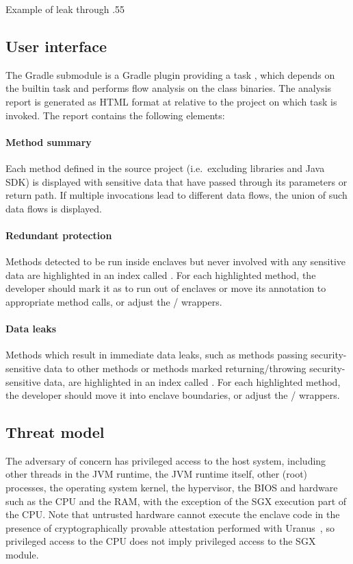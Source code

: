 {Example of leak through }{.55}

\subsection{User interface}\label{subsec:user-interface}
The  Gradle submodule
is a Gradle plugin providing a task ,
which depends on the  builtin task
and performs flow analysis on the class binaries.
The analysis report is generated as HTML format at
relative to the project on which task is invoked.
The report contains the following elements:

\paragraph{Method summary}
Each method defined in the source project (i.e.\ excluding libraries and Java \ac{SDK})
is displayed with sensitive data that have passed through its parameters or return path.
If multiple invocations lead to different data flows,
the union of such data flows is displayed.

\paragraph{Redundant protection}
Methods detected to be run inside enclaves but never involved with any sensitive data
are highlighted in an index called .
For each highlighted method, the developer
should mark it as  to run out of enclaves
or move its  annotation to appropriate method calls,
or adjust the / wrappers.

\paragraph{Data leaks}
Methods which result in immediate data leaks,
such as methods passing security-sensitive data to other  methods
or methods marked  returning/throwing security-sensitive data,
are highlighted in an index called .
For each highlighted method, the developer
should move it into enclave boundaries,
or adjust the / wrappers.

\subsection{Threat model}\label{subsec:threat-model}
The adversary of concern has privileged access to the host system,
including other threads in the \ac{JVM} runtime, the \ac{JVM} runtime itself,
other (root) processes, the operating system kernel,
the hypervisor, the BIOS and hardware such as the CPU and the RAM,
with the exception of the \ac{SGX} execution part of the CPU\@.
Note that untrusted hardware cannot execute the enclave code
in the presence of cryptographically provable attestation performed with Uranus~\cite{uranus},
so privileged access to the CPU does not imply privileged access to the \ac{SGX} module.

